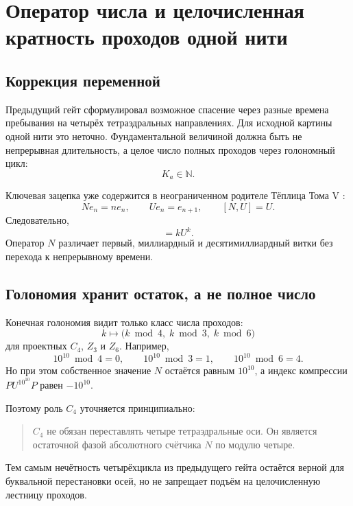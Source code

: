 \chapter{Оператор числа и целочисленная кратность проходов одной нити}
\label{ch:v6-single-thread-c4-suspension-parent-gate}

\section{Коррекция переменной}

Предыдущий гейт сформулировал возможное спасение через разные времена
пребывания на четырёх тетраэдральных направлениях. Для исходной картины
одной нити это неточно. Фундаментальной величиной должна быть не
непрерывная длительность, а целое число полных проходов через голономный
цикл:
\begin{equation}
 K_a\in\mathbb N.
\end{equation}

Ключевая зацепка уже содержится в неограниченном родителе Тёплица Тома V
\cite{single-thread-bourne-kellendonk-rennie2017,
single-thread-arici-mesland2020}:
\begin{equation}
 Ne_n=ne_n,
 \qquad
 Ue_n=e_{n+1},
 \qquad
 [N,U]=U.
\end{equation}
Следовательно,
\begin{equation}
 [N,U^k]=kU^k.
\end{equation}
Оператор $N$ различает первый, миллиардный и десятимиллиардный витки без
перехода к непрерывному времени.

\section{Голономия хранит остаток, а не полное число}

Конечная голономия видит только класс числа проходов:
\begin{equation}
 k\longmapsto
 \bigl(k\bmod4,\;k\bmod3,\;k\bmod6\bigr)
\end{equation}
для проектных $C_4$, $Z_3$ и $Z_6$. Например,
\begin{equation}
 10^{10}\bmod4=0,
 \qquad
 10^{10}\bmod3=1,
 \qquad
 10^{10}\bmod6=4.
\end{equation}
Но при этом собственное значение $N$ остаётся равным $10^{10}$, а индекс
компрессии $PU^{10^{10}}P$ равен $-10^{10}$.

Поэтому роль $C_4$ уточняется принципиально:
\begin{quote}
$C_4$ не обязан переставлять четыре тетраэдральные оси. Он является
остаточной фазой абсолютного счётчика $N$ по модулю четыре.
\end{quote}
Тем самым нечётность четырёхцикла из предыдущего гейта остаётся верной для
буквальной перестановки осей, но не запрещает подъём на целочисленную
лестницу проходов.

